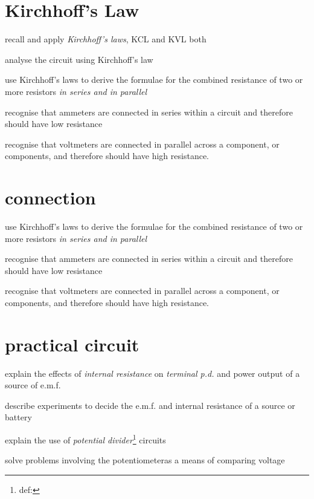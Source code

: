\documentclass[a4paper]{tufte-handout}
\begin{document}
\section{Kirchhoff's Law}
\begin{todolist}
  \item recall and apply \emph{Kirchhoff’s laws}, KCL and KVL both
  \item analyse the circuit using Kirchhoff's law
  \item use Kirchhoff’s laws to derive the formulae for the combined resistance of two or more resistors \emph{in series and in parallel}
  \item recognise that ammeters are connected in series within a circuit and therefore should have low resistance
  \item recognise that voltmeters are connected in parallel across a component, or components, and therefore should have high resistance.
\end{todolist}
\clearpage

\section{connection}
\begin{todolist}
  \item use Kirchhoff’s laws to derive the formulae for the combined resistance of two or more resistors \emph{in series and in parallel}
  \item recognise that ammeters are connected in series within a circuit and therefore should have low resistance
  \item recognise that voltmeters are connected in parallel across a component, or components, and therefore should have high resistance.
\end{todolist}
\clearpage

\section{practical circuit}
\begin{todolist}
  \item explain the effects of \emph{internal resistance} on \emph{terminal p.d.} and power output of a source of e.m.f.
  \item describe experiments to decide the e.m.f. and internal resistance of a source or battery
  \item explain the use of \emph{potential divider}\footnote{def:} circuits
  \item solve problems involving the potentiometeras a means of comparing voltage
\end{todolist}
\clearpage
\end{document}
